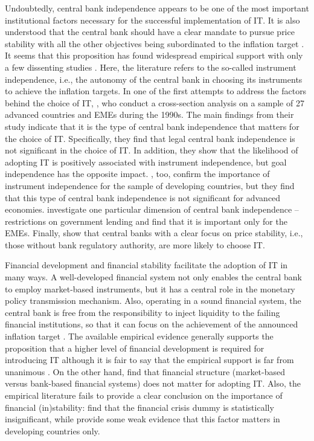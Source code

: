 \documentclass{article}
\begin{document}
Undoubtedly, central bank independence appears to be one of the most important institutional factors necessary for the successful implementation of IT. It is also understood that the central bank should have a clear mandate to pursue price stability with all the other objectives being subordinated to the inflation target \citep{Agenor2002}. It seems that this proposition has found widespread empirical support \citep{Fouejieu2017, Lin2007, Lucotte2010, Lucotte2012, Minea2014} with only a few dissenting studies \citep{Hu2006, Lin2009}. Here, the literature refers to the so-called instrument independence, i.e., the autonomy of the central bank in choosing its instruments to achieve the inflation targets. In one of the first attempts to address the factors behind the choice of IT, \citet{mishkin2002}, who conduct a cross-section analysis on a sample of 27 advanced countries and EMEs during the 1990s. The main findings from their study indicate that it is the type of central bank independence that matters for the choice of IT. Specifically, they find that legal central bank independence is not significant in the choice of IT. In addition, they show that the likelihood of adopting IT is positively associated with instrument independence, but goal independence has the opposite impact. \citet{samarina2014}, too, confirm the importance of instrument independence for the sample of developing countries, but they find that this type of central bank independence is not significant for advanced economies. \citet{carare2006} investigate one particular dimension of central bank independence – restrictions on government lending and find that it is important only for the EMEs. Finally, \citet{mukherjee2008} show that central banks with a clear focus on price stability, i.e., those without bank regulatory authority, are more likely to choose IT.

Financial development and financial stability facilitate the adoption of IT in many ways. A well-developed financial system not only enables the central bank to employ market-based instruments, but it has a central role in the monetary policy transmission mechanism. Also, operating in a sound financial system, the central bank is free from the responsibility to inject liquidity to the failing financial institutions, so that it can focus on the achievement of the announced inflation target \citep{Battini2007, Carare2002}. The available empirical evidence generally supports the proposition that a higher level of financial development is required for introducing IT \citep{Carare2006, deMendonca2012, Leyva2008, Samarina2014, Samarina2014, Thornton2017, Vega2005} although it is fair to say that the empirical support is far from unanimous \citep{Ardakani2018, Hu2006, Lucotte2010, Lucotte2012, Samarina2014}. On the other hand, \citet{samarina2014} find that financial structure (market-based versus bank-based financial systems) does not matter for adopting IT. Also, the empirical literature fails to provide a clear conclusion on the importance of financial (in)stability: \citet{samarina2014} find that the financial crisis dummy is statistically insignificant, while \citet{thornton2017} provide some weak evidence that this factor matters in developing countries only.
\end{document}
